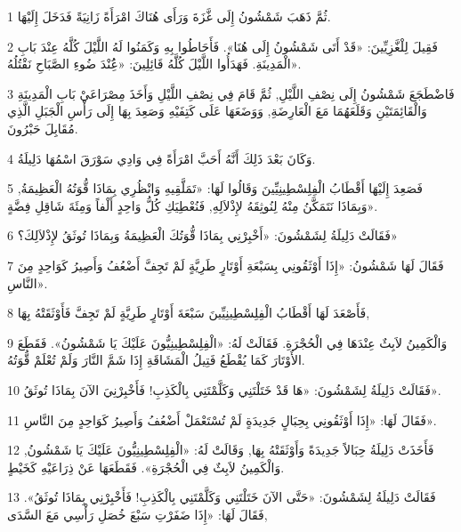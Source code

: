 \par 1 ثُمَّ ذَهَبَ شَمْشُونُ إِلَى غَّزَةَ وَرَأَى هُنَاكَ امْرَأَةً زَانِيَةً فَدَخَلَ إِلَيْهَا.
\par 2 فَقِيلَ لِلْغَّزِيِّينَ: «قَدْ أَتَى شَمْشُونُ إِلَى هُنَا». فَأَحَاطُوا بِهِ وَكَمَنُوا لَهُ اللَّيْلَ كُلَّهُ عِنْدَ بَابِ الْمَدِينَةِ. فَهَدَأُوا اللَّيْلَ كُلَّهُ قَائِلِينَ: «عَُِنْدَ ضُوءِ الصَّبَاحِ نَقْتُلُهُ».
\par 3 فَاضْطَجَعَ شَمْشُونُ إِلَى نِصْفِ اللَّيْلِ, ثُمَّ قَامَ فِي نِصْفِ اللَّيْلِ وَأَخَذَ مِصْرَاعَيْ بَابِ الْمَدِينَةِ وَالْقَائِمَتَيْنِ وَقَلَعَهُمَا مَعَ الْعَارِضَةِ, وَوَضَعَهَا عَلَى كَتِفَيْهِ وَصَعِدَ بِهَا إِلَى رَأْسِ الْجَبَلِ الَّذِي مُقَابِلَ حَبْرُونَ.
\par 4 وَكَانَ بَعْدَ ذَلِكَ أَنَّهُ أَحَبَّ امْرَأَةً فِي وَادِي سَوْرَقَ اسْمُهَا دَلِيلَةُ.
\par 5 فَصَعِدَ إِلَيْهَا أَقْطَابُ الْفِلِسْطِينِيِّينَ وَقَالُوا لَهَا: «تَمَلَّقِيهِ وَانْظُرِي بِمَاذَا قُّوَتُهُ الْعَظِيمَةُ, وَبِمَاذَا نَتَمَكَّنُ مِنْهُ لِنُوثِقَهُ لإِذْلاَلِهِ, فَنُعْطِيَكِ كُلُّ وَاحِدٍ أَلْفاً وَمِئَةَ شَاقِلِ فِضَّةٍ».
\par 6 فَقَالَتْ دَلِيلَةُ لِشَمْشُونَ: «أَخْبِرْنِي بِمَاذَا قُّوَتُكَ الْعَظِيمَةُ وَبِمَاذَا تُوثَقُ لإِذْلاَلِكَ؟»
\par 7 فَقَالَ لَهَا شَمْشُونُ: «إِذَا أَوْثَقُونِي بِسَبْعَةِ أَوْتَارٍ طَرِيَّةٍ لَمْ تَجِفَّ أَضْعُفُ وَأَصِيرُ كَوَاحِدٍ مِنَ النَّاسِ».
\par 8 فَأَصْعَدَ لَهَا أَقْطَابُ الْفِلِسْطِينِيِّينَ سَبْعَةَ أَوْتَارٍ طَرِيَّةٍ لَمْ تَجِفَّ فَأَوْثَقَتْهُ بِهَا,
\par 9 وَالْكَمِينُ لاَبِثٌ عِنْدَهَا فِي الْحُجْرَةِ. فَقَالَتْ لَهُ: «الْفِلِسْطِينِيُّونَ عَلَيْكَ يَا شَمْشُونُ». فَقَطَعَ الأَوْتَارَ كَمَا يُقْطَعُ فَتِيلُ الْمَشَاقَةِ إِذَا شَمَّ النَّارَ وَلَمْ تُعْلَمْ قُّوَتُهُ.
\par 10 فَقَالَتْ دَلِيلَةُ لِشَمْشُونَ: «هَا قَدْ خَتَلْتَنِي وَكَلَّمْتَنِي بِالْكَذِبِ! فَأَخْبِرْنِيَ الآنَ بِمَاذَا تُوثَقُ».
\par 11 فَقَالَ لَهَا: «إِذَا أَوْثَقُونِي بِحِبَالٍ جَدِيدَةٍ لَمْ تُسْتَعْمَلْ أَضْعُفُ وَأَصِيرُ كَوَاحِدٍ مِنَ النَّاسِ».
\par 12 فَأَخَذَتْ دَلِيلَةُ حِبَالاً جَدِيدَةً وَأَوْثَقَتْهُ بِهَا, وَقَالَتْ لَهُ: «الْفِلِسْطِينِيُّونَ عَلَيْكَ يَا شَمْشُونُ, وَالْكَمِينُ لاَبِثٌ فِي الْحُجْرَةِ». فَقَطَعَهَا عَنْ ذِرَاعَيْهِ كَخَيْطٍ.
\par 13 فَقَالَتْ دَلِيلَةُ لِشَمْشُونَ: «حَتَّى الآنَ خَتَلْتَنِي وَكَلَّمْتَنِي بِالْكَذِبِ! فَأَخْبِرْنِي بِمَاذَا تُوثَقُ». فَقَالَ لَهَا: «إِذَا ضَفَرْتِ سَبْعَ خُصَلِ رَأْسِي مَعَ السَّدَى,
